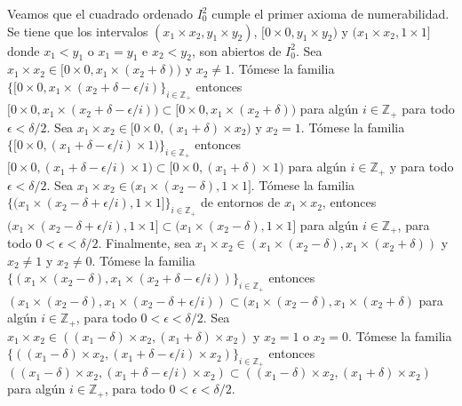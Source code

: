 \documentclass{article}
\begin{document}
Veamos que el cuadrado ordenado $I_0^2$ cumple el primer axioma de numerabilidad. Se tiene que los intervalos $(x_1\times x_2,y_1\times y_2)$, $[0\times 0,y_1\times y_2)$ y $(x_1\times x_2,1\times 1]$ donde $x_1<y_1$ o $x_1=y_1$ e $x_2<y_2$, son abiertos de $I_0^2$. Sea $x_1\times x_2\in [0\times 0,x_1\times (x_2+\delta))$ y $x_2\neq 1$. Tómese la familia $\{[0\times 0 ,x_1\times (x_2+\delta-\epsilon/i)\}_{i\in\mathbb{Z}_+}$ entonces 
$[0\times 0 ,x_1\times (x_2+\delta-\epsilon/i))\subset[0\times 0,x_1\times (x_2+\delta))$ para algún $i\in\mathbb{Z}_+$ para todo $\epsilon<\delta/2$. Sea $x_1\times x_2\in [0\times 0,(x_1+\delta)\times x_2)$ y $x_2=1$. Tómese la familia $\{[0\times 0 ,(x_1+\delta-\epsilon/i)\times 1)\}_{i\in\mathbb{Z}_+}$ entonces 
$[0\times 0 ,(x_1+\delta-\epsilon/i)\times 1)\subset[0\times 0,(x_1+\delta)\times 1)$ para algún $i\in\mathbb{Z}_+$ y para todo $\epsilon<\delta/2$. Sea $x_1\times x_2\in (x_1\times (x_2-\delta),1\times 1]$. Tómese la familia $\{(x_1\times (x_2-\delta+\epsilon/i),1\times 1]\}_{i\in\mathbb{Z}_+}$ de entornos de $x_1\times x_2$, entonces 
$(x_1\times (x_2-\delta+\epsilon/i),1\times 1]\subset (x_1\times (x_2-\delta),1\times 1]$ para algún $i\in\mathbb{Z}_+$, para todo $0<\epsilon<\delta/2$. Finalmente, sea $x_1\times x_2\in (x_1\times (x_2-\delta),x_1\times (x_2+\delta))$ y $x_2\neq 1$ y $x_2\neq 0$. Tómese la familia $\{(x_1\times (x_2-\delta),x_1\times (x_2+\delta-\epsilon/i))\}_{i\in\mathbb{Z}_+}$ entonces 
$(x_1\times (x_2-\delta),x_1\times(x_2-\delta+\epsilon/i))\subset (x_1\times (x_2-\delta),x_1\times (x_2+\delta)$ para algún $i\in\mathbb{Z}_+$, para todo $0<\epsilon<\delta/2$. Sea $x_1\times x_2\in ((x_1-\delta)\times x_2,(x_1+\delta)\times x_2)$ y $x_2= 1$ o $x_2= 0$. Tómese la familia $\{((x_1-\delta)\times x_2,(x_1+\delta-\epsilon/i)\times x_2)\}_{i\in\mathbb{Z}_+}$ entonces $((x_1-\delta)\times x_2,(x_1+\delta-\epsilon/i)\times x_2)\subset ((x_1-\delta)\times x_2,(x_1+\delta)\times x_2)$ para algún $i\in\mathbb{Z}_+$, para todo $0<\epsilon<\delta/2$.
\end{document}
